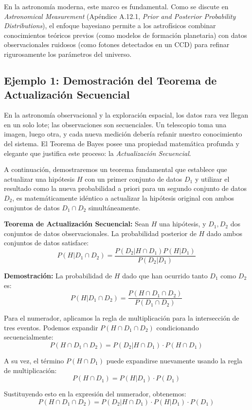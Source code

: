 En la astronomía moderna, este marco es fundamental. Como se discute en \textit{Astronomical Measurement} (Apéndice A.12.1, \textit{Prior and Posterior Probability Distributions}), el enfoque bayesiano permite a los astrofísicos combinar conocimientos teóricos previos (como modelos de formación planetaria) con datos observacionales ruidosos (como fotones detectados en un CCD) para refinar rigurosamente los parámetros del universo.

\subsection{Ejemplo 1: Demostración del Teorema de Actualización Secuencial}

En la astronomía observacional y la exploración espacial, los datos rara vez llegan en un solo lote; las observaciones son secuenciales. Un telescopio toma una imagen, luego otra, y cada nueva medición debería refanir nuestro conocimiento del sistema. El Teorema de Bayes posee una propiedad matemática profunda y elegante que justifica este proceso: la \textit{Actualización Secuencial}. 

A continuación, demostraremos un teorema fundamental que establece que actualizar una hipótesis $H$ con un primer conjunto de datos $D_1$ y utilizar el resultado como la nueva probabilidad a priori para un segundo conjunto de datos $D_2$, es matemáticamente idéntico a actualizar la hipótesis original con ambos conjuntos de datos $D_1 \cap D_2$ simultáneamente.

\textbf{Teorema de Actualización Secuencial:}
Sean $H$ una hipótesis, y $D_1, D_2$ dos conjuntos de datos observacionales. La probabilidad posterior de $H$ dado ambos conjuntos de datos satisface:
$$ P(H | D_1 \cap D_2) = \frac{P(D_2 | H \cap D_1) P(H | D_1)}{P(D_2 | D_1)} $$

\textbf{Demostración:}
La probabilidad de $H$ dado que han ocurrido tanto $D_1$ como $D_2$ es:
$$ P(H | D_1 \cap D_2) = \frac{P(H \cap D_1 \cap D_2)}{P(D_1 \cap D_2)} $$

Para el numerador, aplicamos la regla de multiplicación para la intersección de tres eventos. Podemos expandir $P(H \cap D_1 \cap D_2)$ condicionando secuencialmente:
$$ P(H \cap D_1 \cap D_2) = P(D_2 | H \cap D_1) \cdot P(H \cap D_1) $$

A su vez, el término $P(H \cap D_1)$ puede expandirse nuevamente usando la regla de multiplicación:
$$ P(H \cap D_1) = P(H | D_1) \cdot P(D_1) $$

Sustituyendo esto en la expresión del numerador, obtenemos:
$$ P(H \cap D_1 \cap D_2) = P(D_2 | H \cap D_1) \cdot P(H | D_1) \cdot P(D_1) $$

